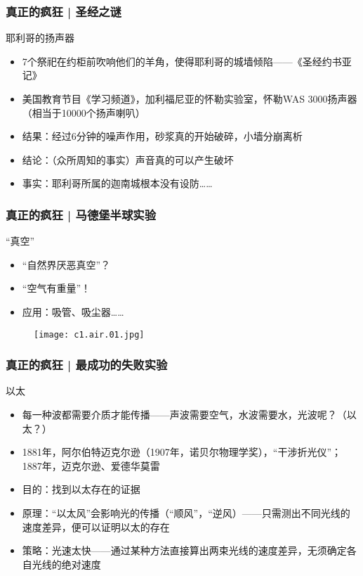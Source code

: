 \begin{frame}
  \frametitle{真正的疯狂 | 圣经之谜}
  \begin{block}{耶利哥的扬声器}
    \begin{itemize}
      \item 7个祭祀在约柜前吹响他们的羊角，使得耶利哥的城墙倾陷——《圣经\textbullet 约书亚记》
      \item 美国教育节目《学习频道》，加利福尼亚的怀勒实验室，怀勒WAS 3000扬声器（相当于10000个扬声喇叭）
      \item 结果：经过6分钟的噪声作用，砂浆真的开始破碎，小墙分崩离析
      \item 结论：（众所周知的事实）声音真的可以产生破坏
      \item 事实：耶利哥所属的迦南城根本没有设防……
    \end{itemize}
  \end{block}
\end{frame}

\begin{frame}
  \frametitle{真正的疯狂 | 马德堡半球实验}
  \begin{block}{“真空”}
    \begin{itemize}
      \item “自然界厌恶真空”？
      \item “空气有重量”！
      \item 应用：吸管、吸尘器……
    \end{itemize}
  \begin{figure}
    \centering
    \texttt{[image: c1.air.01.jpg]}
  \end{figure}
  \end{block}
\end{frame}

\begin{frame}
  \frametitle{真正的疯狂 | 最成功的失败实验}
  \begin{block}{以太}
    \begin{itemize}
      \item 每一种波都需要介质才能传播——声波需要空气，水波需要水，光波呢？（以太？）
      \item 1881年，阿尔伯特\textbullet 迈克尔逊（1907年，诺贝尔物理学奖），“干涉折光仪”；1887年，迈克尔逊、爱德华\textbullet 莫雷
      \item 目的：找到以太存在的证据
      \item 原理：“以太风”会影响光的传播（“顺风”，“逆风）——只需测出不同光线的速度差异，便可以证明以太的存在
      \item 策略：光速太快——通过某种方法直接算出两束光线的速度差异，无须确定各自光线的绝对速度
    \end{itemize}
  \end{block}
\end{frame}

